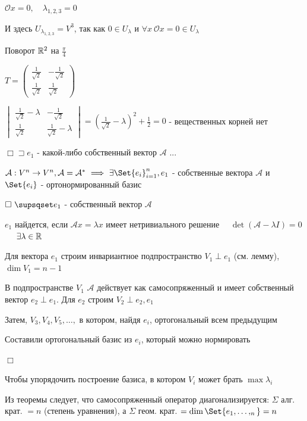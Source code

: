\documentclass[12pt]{article}
\begin{document}
    $\mathcal{O}x = 0, \quad \lambda_{1,2,3} = 0$

    И здесь $U_{\lambda_{1,2,3}} = V^3$, так как $0 \in U_\lambda$ и $\forall x \ \mathcal{O}x = 0 \in U_\lambda$

     Поворот $\mathbb{R}^2$ на $\frac{\pi}{4}$

    $T = \begin{pmatrix}\frac{1}{\sqrt{2}} & -\frac{1}{\sqrt{2}} \\ \frac{1}{\sqrt{2}} & \frac{1}{\sqrt{2}}\end{pmatrix}$

    $\begin{vmatrix}\frac{1}{\sqrt{2}} - \lambda & -\frac{1}{\sqrt{2}} \\ \frac{1}{\sqrt{2}} & \frac{1}{\sqrt{2}} - \lambda\end{vmatrix} =
    \left(\frac{1}{\sqrt{2}} - \lambda\right)^2 + \frac{1}{2} = 0$ - вещественных корней нет

    $\Box \sqsupset e_1$ - какой-либо собственный вектор $\mathcal{A}$ ...



    \Th $\mathcal{A}: V^n \to V^n, \mathcal{A} = \mathcal{A}^* \ \Longrightarrow \ \exists \Set{e_i}^n_{i=1}, e_1$ -
    собственные вектора $\mathcal{A}$ и $\Set{e_i}$ - ортонормированный базис

    $\Box \ \supsqset e_1$ - собственный вектор $\mathcal{A}$

    $e_1$ найдется, если $\mathcal{A}x = \lambda x$ имеет нетривиального решение \ \Longleftrightarrow \
    $\det(\mathcal{A} - \lambda I) = 0$ \  \ $\exists \lambda \in \mathbb{R}$

    Для вектора $e_1$ строим инвариантное подпространство $V_1 \perp e_1$ (см. лемму), $\dim V_1 = n - 1$

    В подпространстве $V_1$ $\mathcal{A}$ действует как самосопряженный и имеет собственный вектор $e_2 \perp e_1$.
    Для $e_2$ строим $V_2 \perp e_2, e_1$

    Затем, $V_3, V_4, V_5, \dots,$ в котором, найдя $e_i$, ортогональный всем предыдущим

    Составили ортогональный базис из $e_i$, который можно нормировать

    $\Box$

    \Nota Чтобы упорядочить построение базиса, в котором $V_i$ может брать $\max \lambda_i$

    \Nota Из теоремы следует, что самосопряженный оператор диагонализируется: $\Sigma$ алг. крат. $ = n$ (степень уравнения), а $\Sigma$ геом. крат. $= \dim \Set{e_1, \dots, _n} = n$
\end{document}

